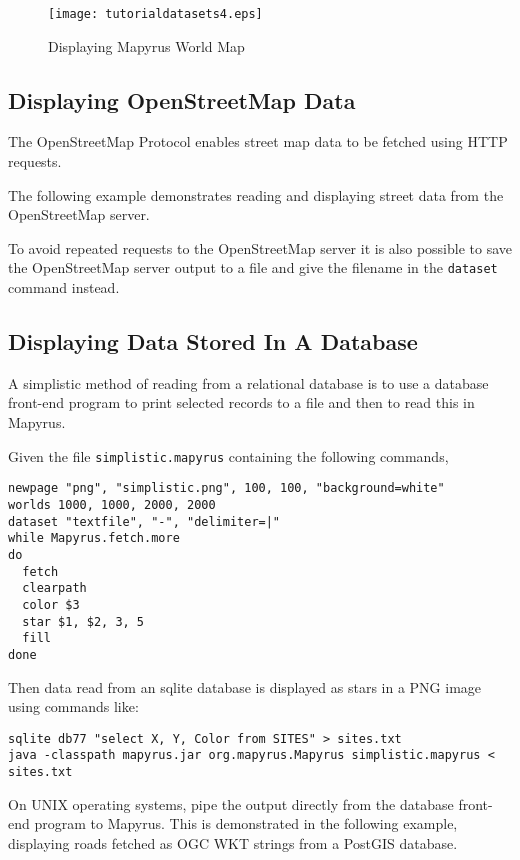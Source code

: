 

\begin{figure}[htb]
\texttt{[image: tutorialdatasets4.eps]}
\caption{Displaying Mapyrus World Map}
\label{tutorialdatasets4}
\end{figure}

\subsection{Displaying OpenStreetMap Data}

The OpenStreetMap Protocol enables street map data to be fetched
using HTTP requests.

The following example demonstrates reading and displaying
street data from the OpenStreetMap server.



To avoid repeated requests to the OpenStreetMap server it is also
possible to save the OpenStreetMap server output to a file and give
the filename in the \texttt{dataset} command instead.

\subsection{Displaying Data Stored In A Database}

A simplistic method of reading from a relational database is to use a database
front-end program to print selected records to a file and then to read this in
Mapyrus.

Given the file \texttt{simplistic.mapyrus} containing the following
commands,

\begin{verbatim}
newpage "png", "simplistic.png", 100, 100, "background=white"
worlds 1000, 1000, 2000, 2000
dataset "textfile", "-", "delimiter=|"
while Mapyrus.fetch.more
do
  fetch
  clearpath
  color $3
  star $1, $2, 3, 5
  fill
done
\end{verbatim}

Then data read from an sqlite database is displayed as stars in a
PNG image using commands like:

\begin{verbatim}
sqlite db77 "select X, Y, Color from SITES" > sites.txt
java -classpath mapyrus.jar org.mapyrus.Mapyrus simplistic.mapyrus < sites.txt
\end{verbatim}

On UNIX operating systems, pipe the output directly from the database
front-end program to Mapyrus.  This is demonstrated in the following
example, displaying roads fetched as OGC WKT strings from a PostGIS database.


